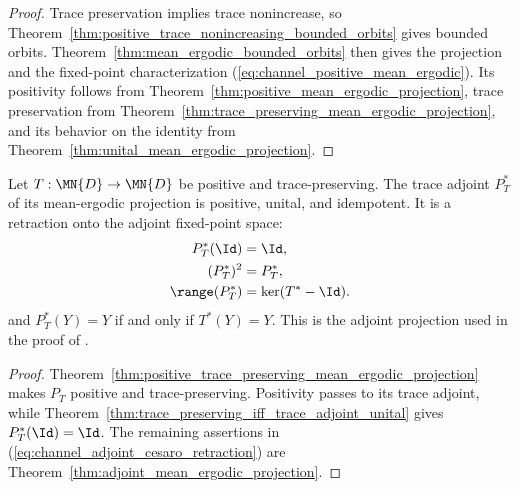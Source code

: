 \begin{proof}\leanok
    Trace preservation implies trace nonincrease, so
    Theorem~\ref{thm:positive_trace_nonincreasing_bounded_orbits} gives
    bounded orbits. Theorem~\ref{thm:mean_ergodic_bounded_orbits} then gives
    the projection and the fixed-point characterization
    (\ref{eq:channel_positive_mean_ergodic}). Its positivity follows from
    Theorem~\ref{thm:positive_mean_ergodic_projection}, trace preservation
    from Theorem~\ref{thm:trace_preserving_mean_ergodic_projection}, and its
    behavior on the identity from
    Theorem~\ref{thm:unital_mean_ergodic_projection}.
\end{proof}

\begin{theorem}
    \label{thm:positive_unital_adjoint_mean_ergodic_retraction}
    \leanok
    Let $T:\MN{D}\to\MN{D}$ be positive and trace-preserving. The trace
    adjoint $P_T^*$ of its mean-ergodic projection is positive, unital, and
    idempotent. It is a retraction onto the adjoint fixed-point space:
    \begin{align}
        P_T^*(\Id)    & =\Id, \notag    \\
        (P_T^*)^2     & =P_T^*, \notag  \\
        \range(P_T^*) & =\ker(T^*-\Id).
        \label{eq:channel_adjoint_cesaro_retraction}
    \end{align}
    and $P_T^*(Y)=Y$ if and only if $T^*(Y)=Y$.
    This is the adjoint projection used in the proof of
    \cite[Theorem~6.14]{Wolf2012Quantum}.
\end{theorem}

\begin{proof}\leanok
    Theorem~\ref{thm:positive_trace_preserving_mean_ergodic_projection} makes
    $P_T$ positive and trace-preserving. Positivity passes to its trace
    adjoint, while
    Theorem~\ref{thm:trace_preserving_iff_trace_adjoint_unital} gives
    $P_T^*(\Id)=\Id$. The remaining assertions in
    (\ref{eq:channel_adjoint_cesaro_retraction}) are
    Theorem~\ref{thm:adjoint_mean_ergodic_projection}.
\end{proof}

